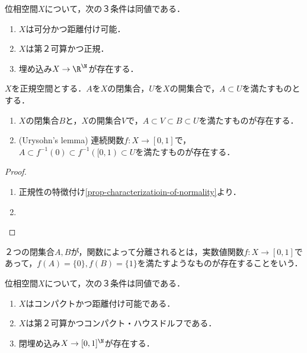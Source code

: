 \documentclass[uplatex,dvipdfmx]{jsreport}
\begin{document}
\begin{theorem}[Urysohnの距離付け定理]
    位相空間$X$について，次の３条件は同値である．
    \begin{enumerate}
        \item $X$は可分かつ距離付け可能．
        \item $X$は第２可算かつ正規．
        \item 埋め込み$X\to\R^\N$が存在する．
    \end{enumerate}
\end{theorem}

\begin{lemma}\label{lemma-Urysohn's-lemma}
    $X$を正規空間とする．$A$を$X$の閉集合，$U$を$X$の開集合で，$A\subset U$を満たすものとする．
    \begin{enumerate}
        \item $X$の閉集合$B$と，$X$の開集合$V$で，$A\subset V\subset B\subset U$を満たすものが存在する．
        \item (Urysohn's lemma) 連続関数$f:X\to[0,1]$で，$A\subset f^{-1}(0)\subset f^{-1}([0,1)\subset U$を満たすものが存在する．
    \end{enumerate}
\end{lemma}
\begin{proof}\mbox{}
    \begin{enumerate}
        \item 正規性の特徴付け\ref{prop-characterizatioin-of-normality}より．
        \item 
    \end{enumerate}
\end{proof}
\begin{remarks}[関数によって分離される]
    ２つの閉集合$A,B$が，関数によって分離されるとは，実数値関数$f:X\to[0,1]$であって，$f(A)=\{0\},f(B)=\{1\}$を満たすようなものが存在することをいう．
\end{remarks}

\begin{corollary}[AC, コンパクト距離空間は閉区間の可算積の閉部分空間と同相である]
    位相空間$X$について，次の３条件は同値である．
    \begin{enumerate}
        \item $X$はコンパクトかつ距離付け可能である．
        \item $X$は第２可算かつコンパクト・ハウスドルフである．
        \item 閉埋め込み$X\to[0,1]^\N$が存在する．
    \end{enumerate}
\end{corollary}
\end{document}
